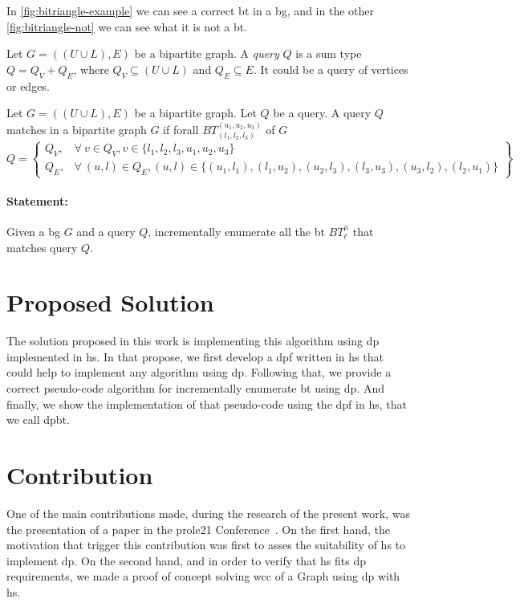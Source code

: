 

In \autoref{fig:bitriangle-example} we can see a correct \acrshort{bt} in a \acrshort{bg}, and in the other \autoref{fig:bitriangle-not} we can see what it is not a \acrshort{bt}.

\begin{definition}[Query]
Let $G=((U\cup L),E)$ be a bipartite graph. 
A \textit{query} $Q$ is a sum type $Q = Q_V + Q_E$, where $Q_V \subseteq (U \cup L)$ and $Q_E \subseteq E$. 
It could be a query of vertices or edges.
\end{definition}

\begin{definition}
  Let $G=((U\cup L),E)$ be a bipartite graph.
  Let $Q$ be a query.
  A query $Q$ matches in a bipartite graph $G$ if forall $BT_{(l_1,l_2,l_3)}^{(u_1,u_2,u_3)}$ of $G$
  \[
    Q = \left\{\begin{array}{lr}
      Q_V, & \forall\ v \in Q_V, v \in \{l_1,l_2,l_3,u_1,u_2,u_3\}\\
      Q_E, & \forall\ (u,l) \in Q_E, (u,l) \in \{(u_1, l_1), (l_1,u_2), (u_2, l_3), (l_3,u_3), (u_3, l_2), (l_2,u_1)\} 
      \end{array}\right\} 
  \]
  \end{definition}
  
\paragraph{Statement:}Given a \acrlong{bg} $G$ and a query $Q$, incrementally enumerate all the \acrlong{bt} $BT_{\ell}^{\mu}$ that matches query $Q$.

\section{Proposed Solution}
The solution proposed in this work is implementing this algorithm using \acrfull{dp} implemented in \acrfull{hs}.
In that propose, we first develop a \acrlong{dpf} written in \acrlong{hs} that could help to implement any algorithm using \acrshort{dp}.
Following that, we provide a correct pseudo-code algorithm for incrementally enumerate \acrshort{bt} using \acrshort{dp}. And finally, we  
show the implementation of that pseudo-code using the \acrshort{dpf} in \acrshort{hs}, that we call \acrfull{dpbt}.

\section{Contribution}
One of the main contributions made, during the research of the present work, was the presentation of a paper in the \acrfull{prole21} Conference~\cite{prole21}. 
On the first hand, the motivation that trigger this contribution was first to asses the suitability of \acrshort{hs} to implement \acrshort{dp}. 
On the second hand, and in order to verify that \acrshort{hs} fits \acrshort{dp} requirements, we made a proof of concept solving \acrfull{wcc} of a Graph 
using \acrshort{dp} with \acrshort{hs}.

